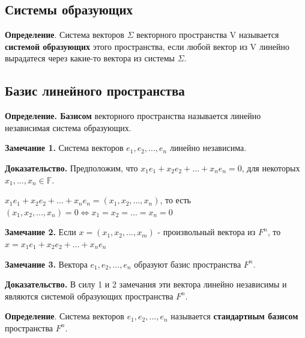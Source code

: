 \documentclass[a4paper]{article}
\begin{document}
\newpage \begin{center}\begin{Large}\end{Large}\end{center}
\subsection*{Системы образующих}
\textbf{Определение}. Система векторов $\Sigma$ векторного пространства V называется \textbf{системой образующих} этого пространства, если любой вектор из V линейно вырадатеся через какие-то вектора из системы $\Sigma$.

\subsection*{Базис линейного пространства}
\textbf{Определение. Базисом} векторного пространства называется линейно независимая
система образующих.

\begin{htheorem}
\textbf{Замечание 1.} Система векторов $e_1, e_2, ..., e_n$ линейно независима.
\end{htheorem}


\begin{hproof}
\textbf{Доказательство.} Предположим, что $x_1e_1+x_2e_2 + ... + x_ne_n = 0$, для некоторых $x_1, ..., x_n \in \mathbb{F}$. 

$x_1e_1+x_2e_2 + ... + x_ne_n = (x_1, x_2, ..., x_n)$, то есть $(x_1, x_2, ..., x_n) = 0 \Leftrightarrow x_1 = x_2 = ... = x_n = 0$
\end{hproof}

\begin{htheorem}
\textbf{Замечание 2.} Если $x = (x_1, x_2, ..., x_m) $ - произвольный вектора из $F^n$, то $x = x_1e_1 + x_2e_2 + ... + x_ne_n$
\end{htheorem}


\begin{htheorem}
\textbf{Замечание 3.} Вектора $e_1, e_2, ..., e_n$ образуют базис пространства $F^n$.
\end{htheorem}

\begin{hproof}
\textbf{Доказательство.} В силу 1 и 2 замечания эти вектора линейно независимы и являются системой образующих пространства $F^n$.
\end{hproof}

\textbf{Определение}. Система векторов $e_1, e_2, ..., e_n$ называется \textbf{стандартным базисом} пространства $F^n$.
\end{document}
